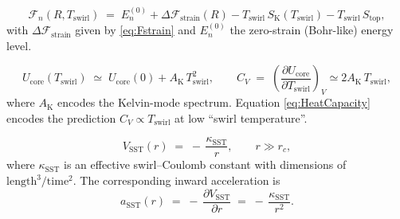 \documentclass[11pt]{article}
\newcommand{\rc}{r_c}                                    %
\begin{document}
            \begin{equation}
                \mathcal{F}_n(R, T_{\text{swirl}})
                \;=\;
                E_n^{(0)}
                + \Delta \mathcal{F}_{\text{strain}}(R)
                - T_{\text{swirl}}\,S_{\mathrm{K}}(T_{\text{swirl}})
                - T_{\text{swirl}}\,S_{\mathrm{top}},
                \label{eq:FreeEnergyOrbital}
            \end{equation}
            with \(\Delta \mathcal{F}_{\text{strain}}\) given by \eqref{eq:Fstrain} and
            \(E_n^{(0)}\) the zero-strain (Bohr-like) energy level.

            \begin{equation}
                U_{\mathrm{core}}(T_{\text{swirl}})
                \;\simeq\;
                U_{\mathrm{core}}(0)
                + A_{\mathrm{K}}\,T_{\text{swirl}}^{2},
                \qquad
                C_V
                \;=\;
                \left(\frac{\partial U_{\mathrm{core}}}{\partial T_{\text{swirl}}}\right)_V
                \simeq
                2 A_{\mathrm{K}}\, T_{\text{swirl}},
                \label{eq:HeatCapacity}
            \end{equation}
            where \(A_{\mathrm{K}}\) encodes the Kelvin-mode spectrum. Equation \eqref{eq:HeatCapacity}
            encodes the prediction \(C_V \propto T_{\text{swirl}}\) at low “swirl temperature”.

            \begin{equation}
                V_{\mathrm{SST}}(r)
                \;=\;
                -\,\frac{\kappa_{\mathrm{SST}}}{r},
                \qquad r \gg \rc,
                \label{eq:VSST_def}
            \end{equation}
            where \(\kappa_{\mathrm{SST}}\) is an effective swirl–Coulomb constant with
            dimensions of \(\mathrm{length}^3/\mathrm{time}^2\). The corresponding inward
            acceleration is
            \begin{equation}
                a_{\mathrm{SST}}(r)
                \;=\;
                -\,\frac{\partial V_{\mathrm{SST}}}{\partial r}
                \;=\;
                -\,\frac{\kappa_{\mathrm{SST}}}{r^2}.
                \label{eq:aSST}
            \end{equation}
\end{document}
